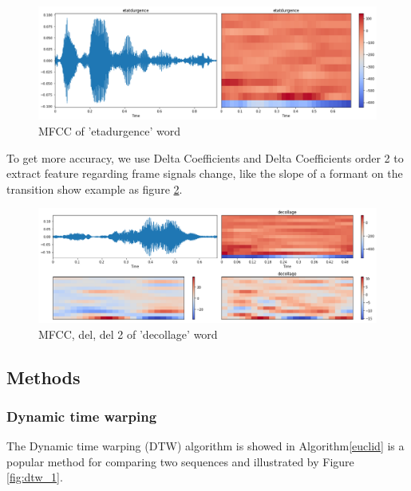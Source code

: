 \documentclass[%
  article,%
  10pt,%
  a4paper,%
  fleqn,%
  oneside,%
  sumario = tradicional,%
  chapter = TITLE,%
  section = TITLE,%
]{abntex2}
\begin{document}
\begin{figure}[H]
  \centering
  \includegraphics[width = 0.8\columnwidth]{./Figuras/mfcc}
  \caption{MFCC of 'etadurgence' word}
  \label{fig:mfcc}
 \end{figure}

To get more accuracy, we use Delta Coefficients and Delta Coefficients order 2 to extract feature regarding frame signals change, like the slope of a formant on the transition show example as figure \ref{fig:mfccdel}.
\begin{figure}[H]
  \centering
  \includegraphics[width = 0.8\columnwidth]{./Figuras/mfcc_del}
  \caption{MFCC, del, del 2 of 'decollage' word}
  \label{fig:mfccdel}
 \end{figure}

\subsection{Methods}

\subsubsection{Dynamic time warping}
The Dynamic time warping (DTW) algorithm is showed in Algorithm\ref{euclid} is a popular method for comparing two sequences and illustrated by Figure \ref{fig:dtw_1}.
\end{document}
